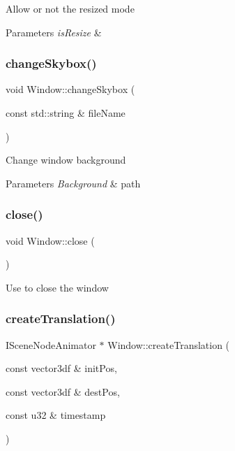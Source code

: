 Allow or not the resized mode 
\begin{DoxyParams}{Parameters}
{\em is\+Resize} & \\
\hline
\end{DoxyParams}
\mbox{\label{class_window_aa26f12180091bab6982bca0e914eb407}} 
\subsubsection{\texorpdfstring{changeSkybox()}{changeSkybox()}}
{\footnotesize\ttfamily void Window\+::change\+Skybox (\begin{DoxyParamCaption}\item[{const std\+::string \&}]{file\+Name }\end{DoxyParamCaption})}

Change window background 
\begin{DoxyParams}{Parameters}
{\em Background} & path \\
\hline
\end{DoxyParams}
\mbox{\label{class_window_a35055c04498121d39741bfcd5082705b}} 
\subsubsection{\texorpdfstring{close()}{close()}}
{\footnotesize\ttfamily void Window\+::close (\begin{DoxyParamCaption}{ }\end{DoxyParamCaption})}

Use to close the window \mbox{\label{class_window_a066dc81fcb73e82697d2bf6ec80dc0f9}} 
\subsubsection{\texorpdfstring{createTranslation()}{createTranslation()}}
{\footnotesize\ttfamily I\+Scene\+Node\+Animator $\ast$ Window\+::create\+Translation (\begin{DoxyParamCaption}\item[{const vector3df \&}]{init\+Pos,  }\item[{const vector3df \&}]{dest\+Pos,  }\item[{const u32 \&}]{timestamp }\end{DoxyParamCaption})}

